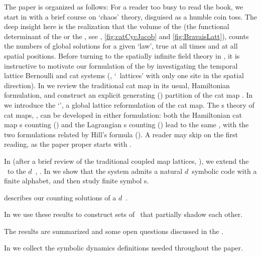 The paper is organized as follows:
For a reader too busy to read the book, we
start in  with a brief course on `chaos' theory,
disguised as a humble coin toss. The deep insight here is the realization
that the volume  of the {\jacobianOrb} (the functional
determinant of the {\fundPip} or the {\HillDet}, see
, \ref{fig:catCycJacob} and
\ref{fig:BravaisLatt}), counts the numbers of global solutions for a
given `law', true at all times and at all spatial positions.
Before turning to the spatially infinite field theory in
, it is instructive to motivate our formulation of the
{\catlatt} by investigating the temporal lattice Bernoulli and cat
systems (\ie, `\spt\ lattices' with only one site in the spatial
direction).
In  we review the traditional cat map in its usual,
Hamiltonian formulation,  and  construct an explicit
generating (\AW) partition of the cat map \statesp.
In  we introduce the `\templatt', a global lattice
reformulation of the cat map.
The \po s theory of cat maps, , can be developed in either
formulation:
both the Hamiltonian cat map \po s counting () and
the Lagrangian {\templatt} \po s counting () lead
to the same {\tzeta}, with the two formulations related by {Hill's
formula} ().
A reader may skip  on the
first reading, as the paper proper starts with .

In  (after a brief review of the traditional coupled
map lattices, ), we extend the \templatt\ to
the $d$\dmn\ \catlatt, .
In  we show that the system admits  a natural
$d$\dmn\ symbolic  code with a finite alphabet, and then study finite
{\spt} symbol \brick s.

describes our counting solutions of a
$d$\dmn\ \catlatt.

In   we use these  results to construct
sets of {\spt} \twots\ that partially shadow each other.

The results are summarized and some open questions discussed in the
.

In  we collect the symbolic dynamics definitions
needed throughout the paper.

